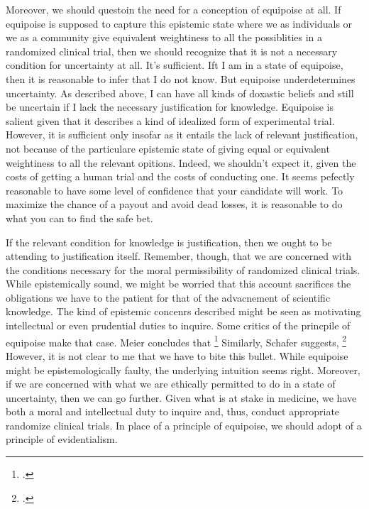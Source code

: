 \documentclass[letterpaper,notitlepage,12pt]{article}
\begin{document}
Moreover, we should questoin the need for a conception of equipoise at all.
If equipoise is supposed to capture this epistemic state where we as individuals
or we as a community give equivalent weightiness to all the possiblities in a
randomized clinical trial, then we should recognize that it is not a necessary
condition for uncertainty at all.
It's sufficient.
Ift I am in a state of equipoise, then it is reasonable to infer that I do not
know.
But equipoise underdetermines uncertainty.
As described above, I can have all kinds of doxastic beliefs and still be
uncertain if I lack the necessary justification for knowledge.
Equipoise is salient given that it describes a kind of idealized form of
experimental trial.
However, it is sufficient only insofar as it entails the lack of relevant
justification, not because of the particulare epistemic state of giving equal or
equivalent weightiness to all the relevant opitions.
Indeed, we shouldn't expect it, given the costs of getting a human trial and the
costs of conducting one.
It seems pefectly reasonable to have some level of confidence that your
candidate will work.
To maximize the chance of a payout and avoid dead losses, it is reasonable to do
what you can to find the safe bet.

If the relevant condition for knowledge is justification, then we ought to be
attending to justification itself.
Remember, though, that we are concerned with the conditions necessary for the
moral permissibility of randomized clinical trials.
While epistemically sound, we might be worried that this account sacrifices the
obligations we have to the patient for that of the advacnement of scientific
knowledge.
The kind of epistemic concenrs described might be seen as motivating
intellectual or even prudential duties to inquire.
Some critics of the princpile of equipoise make that case.
Meier concludes that \footcite[p. 640]{meier_terminating_1979}
Similarly, Schafer suggests, \footcite[p. 6]{schafer_commentary_1985}
However, it is not clear to me that we have to bite this bullet.
While equipoise might be epistemologically faulty, the underlying intuition
seems right.
Moreover, if we are concerned with what we are ethically permitted to do in a
state of uncertainty, then we can go further.
Given what is at stake in medicine, we have both a moral and intellectual duty
to inquire and, thus, conduct appropriate randomize clinical trials.
In place of a principle of equipoise, we should adopt of a principle of
evidentialism.
\end{document}
